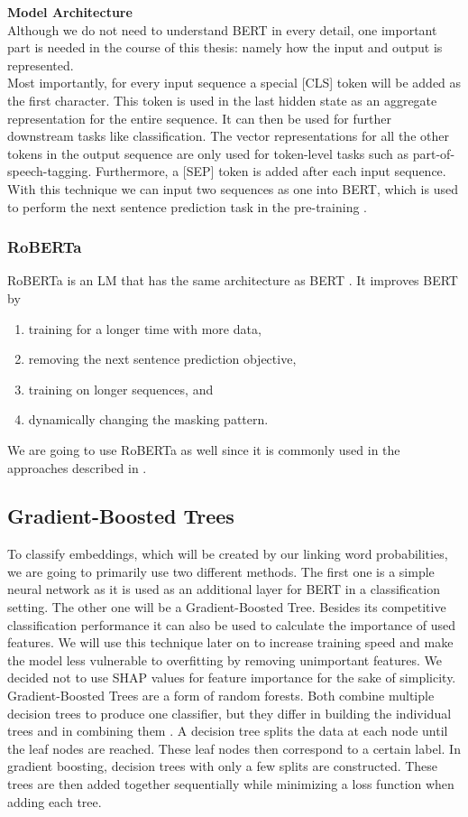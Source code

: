 \textbf{Model Architecture} \\
Although we do not need to understand BERT in every detail, one important part is needed in the course of this thesis: namely how the input and output is represented. \\
Most importantly, for every input sequence a special [CLS] token will be added as the first character. This token is used in the last hidden state as an aggregate representation for the entire sequence. It can then be used for further downstream tasks like classification. The vector representations for all the other tokens in the output sequence are only used for token-level tasks such as part-of-speech-tagging. Furthermore, a [SEP] token is added after each input sequence. With this technique we can input two sequences as one into BERT, which is used to perform the next sentence prediction task in the pre-training \cite{bert}.


\subsubsection{RoBERTa}
RoBERTa is an LM that has the same architecture as BERT \cite{roberta}. It improves BERT by
\begin{enumerate}
	\item training for a longer time with more data,
	\item removing the next sentence prediction objective,
	\item training on longer sequences, and
	\item dynamically changing the masking pattern.
\end{enumerate}
We are going to use RoBERTa as well since it is commonly used in the approaches described in \cite{argsvalidnovel2022}.

\subsection{Gradient-Boosted Trees}
To classify embeddings, which will be created by our linking word probabilities, we are going to primarily use two different methods. The first one is a simple neural network as it is used as an additional layer for BERT in a classification setting. The other one will be a Gradient-Boosted Tree. Besides its competitive classification performance it can also be used to calculate the importance of used features. We will use this technique later on to increase training speed and make the model less vulnerable to overfitting by removing unimportant features. We decided not to use SHAP values \cite{shap} for feature importance for the sake of simplicity. \\
Gradient-Boosted Trees are a form of random forests. Both combine multiple decision trees to produce one classifier, but they differ in building the individual trees and in combining them \cite{gradboost}. A decision tree splits the data at each node until the leaf nodes are reached. These leaf nodes then correspond to a certain label. In gradient boosting, decision trees with only a few splits are constructed. These trees are then added together sequentially while minimizing a loss function when adding each tree.

